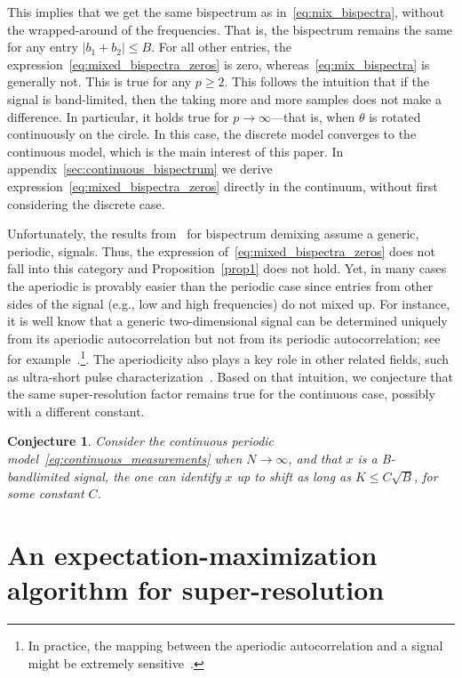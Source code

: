 \documentclass[english,12pt]{article}
\newcommand{\TODO}[1]{{\color{red}{[#1]}}}
\numberwithin{equation}{section}
\numberwithin{thm}{section} %
\newtheorem{conj}[thm]{Conjecture}
\begin{document}
This implies that we get the same bispectrum as in~\eqref{eq:mix_bispectra}, without the wrapped-around of the frequencies. 
That is, the bispectrum remains the same for any entry $\vert b_1 + b_2\vert \leq B$. For all other entries, the expression~\eqref{eq:mixed_bispectra_zeros} is zero, whereas~\eqref{eq:mix_bispectra} is generally not. 
This is true for any $p\geq 2$. 
This follows the intuition that if the signal is band-limited, then the taking more and more samples does not make a difference. \TODO{Does it?} 
In particular, it holds true for $p\to\infty$---that is, when $\theta$ is rotated continuously on the circle. In this case, the discrete model converges to the continuous model, which is the main interest of this paper. In appendix~\ref{sec:continuous_bispectrum} we derive expression~\eqref{eq:mixed_bispectra_zeros} directly in the continuum, without first considering the discrete case. 

Unfortunately, the results from~\cite{bandeira2017estimation} for bispectrum demixing assume a generic, periodic, signals. Thus, the expression of~\eqref{eq:mixed_bispectra_zeros} does not fall into this category and Proposition~\ref{prop1} does not hold. Yet, in many cases the aperiodic is provably easier than the periodic case since entries from other sides of the signal (e.g.,
low and high frequencies) do not mixed up. 
For instance, it is well know that a generic two-dimensional signal can be determined uniquely from its aperiodic autocorrelation but not from its periodic autocorrelation; see for example~\cite{hayes1982reconstruction}.\footnote{In practice, the mapping between the aperiodic autocorrelation and a signal might be extremely sensitive~\cite{barnett2018geometry}.}. The aperiodicity also plays a key role in other related fields, such as ultra-short pulse characterization~\cite{bendory2018signal}. 
Based on that intuition, we conjecture that the same super-resolution factor remains true for the continuous case, possibly with a different constant. 

\begin{conj} \label{conj:continuous}
Consider the  continuous periodic model~\eqref{eq:continuous_measurements} when $N\to\infty$, and that $x$ is a B-bandlimited signal, the  one can identify $x$ up to shift as long as $K\leq C \sqrt{B}$, for some constant $C$.
\end{conj}

\section{An expectation-maximization algorithm for super-resolution}
\end{document}
